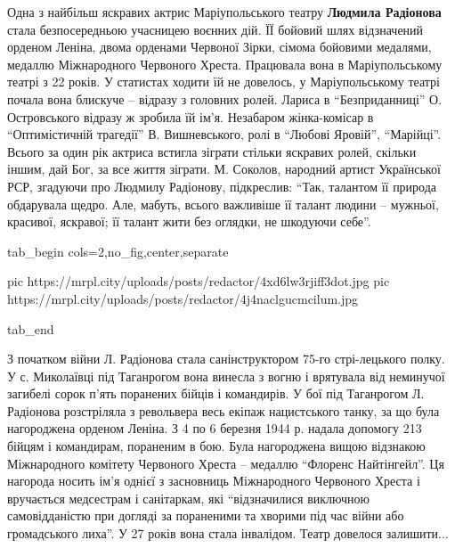 
Одна з найбільш яскравих актрис Маріупольського театру \textbf{Людмила Радіонова} стала
безпосередньою учасницею воєнних дій. ЇЇ бойовий шлях відзначений орденом
Леніна, двома орденами Червоної Зірки, сімома бойовими медалями, медаллю
Міжнародного Червоного Хреста. Працювала вона в Маріупольському театрі з 22
років. У статистах ходити їй не довелось, у Маріупольському театрі почала вона
блискуче – відразу з головних ролей. Лариса в \enquote{Безприданниці} О. Островського
відразу ж зробила їй ім'я. Незабаром жінка-комісар в \enquote{Оптимістичній трагедії}
В. Вишневського, ролі в \enquote{Любові Яровій}, \enquote{Марійці}. Всього за один рік актриса
встигла зіграти стільки яскравих ролей, скільки іншим, дай Бог, за все життя
зіграти. М. Соколов, народний артист Української РСР, згадуючи про Людмилу
Радіонову, підкреслив: \enquote{Так, талантом її природа обдарувала щедро. Але,
мабуть, всього важливіше її талант людини – мужньої, красивої, яскравої; її
талант жити без оглядки, не шкодуючи себе}.

\ifcmt
  tab_begin cols=2,no_fig,center,separate

  pic https://mrpl.city/uploads/posts/redactor/4xd6lw3rjiff3dot.jpg
  pic https://mrpl.city/uploads/posts/redactor/4j4naclgucmcilum.jpg

  tab_end
\fi

З початком війни Л. Радіонова стала санінструктором 75-го стрі\hyp{}лецького полку. У
с. Миколаївці під Таганрогом вона винесла з вогню і врятувала від неминучої
загибелі сорок п'ять поранених бійців і командирів. У бої під Таганрогом Л.
Радіонова розстріляла з револьвера весь екіпаж нацистського танку, за що була
нагороджена орденом Леніна. З 4 по 6 березня 1944 р. надала допомогу 213 бійцям
і командирам, пораненим в бою. Була нагороджена вищою відзнакою Міжнародного
комітету Червоного Хреста – медаллю \enquote{Флоренс Найтінгейл}. Ця нагорода носить
ім'я однієї з засновниць Міжнародного Червоного Хреста і вручається медсестрам
і санітаркам, які \enquote{відзначилися виключною самовідданістю при догляді за
пораненими та хворими під час війни або громадського лиха}. У 27 років вона
стала інвалідом. Театр довелося залишити...



